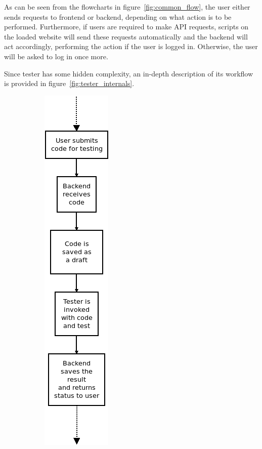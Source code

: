 As can be seen from the flowcharts in figure~\ref{fig:common_flow}, the user either sends requests to frontend or backend, depending on what action is to be performed. Furthermore, if users are required to make API requests, scripts on the loaded website will send these requests automatically and the backend will act accordingly, performing the action if the user is logged in. Otherwise, the user will be asked to log in once more.

Since tester has some hidden complexity, an in-depth description of its workflow is provided in figure~\ref{fig:tester_internals}.
\begin{figure}
    \centering
    \begin{subfigure}{.35\linewidth}
    \centering
    \includegraphics[width=.3\linewidth]{img/tester_usage.png}

\end{subfigure}
\end{figure}
